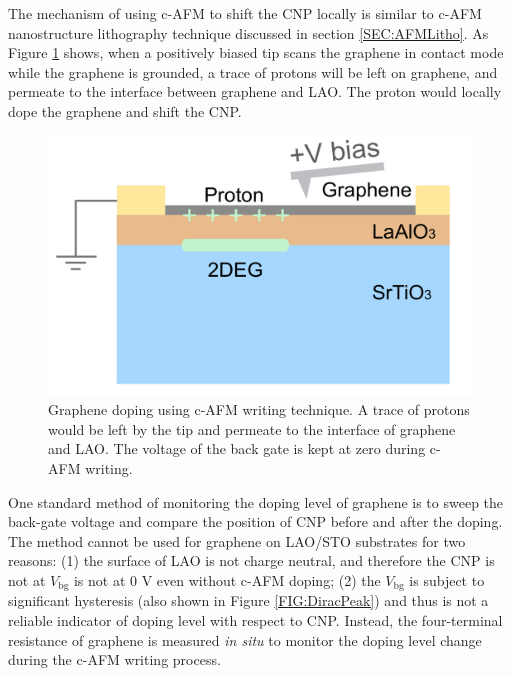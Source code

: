 \documentclass[pdflatex, sectionletters, 12pt]{pittetd}    %
\begin{document}
The mechanism of using c-AFM to shift the CNP locally is similar to c-AFM nanostructure lithography technique discussed in section \ref{SEC:AFMLitho}. As Figure \ref{FIG:GrapheneAFM} shows, when a positively biased tip scans the graphene in contact mode while the graphene is grounded, a trace of protons will be left on graphene, and permeate\cite{hu2014proton} to the interface between graphene and LAO. The proton would locally dope the graphene and shift the CNP. 
\\

\begin{figure}[h!]
	\centering
	\includegraphics[width=.45\textwidth]{Drawing/GrapheneAFM.pdf}
	\caption{Graphene doping using c-AFM writing technique. A trace of protons would be left by the tip and permeate to the interface of graphene and LAO. The voltage of the back gate is kept at zero during c-AFM writing.}
	\label{FIG:GrapheneAFM}
\end{figure}

One standard method of monitoring the doping level of graphene is to sweep the back-gate voltage and compare the position of CNP before and after the doping. The method cannot be used for graphene on LAO/STO substrates for two reasons: (1) the surface of LAO is not charge neutral, and therefore the CNP is not at $V_\mathrm{bg}$ is not at 0 V even without c-AFM doping; (2) the $V_\mathrm{bg}$ is subject to significant hysteresis\cite{couto2011transport, jnawali2017room} (also shown in Figure \ref{FIG:DiracPeak}) and thus is not a reliable indicator of doping level with respect to CNP. Instead, the four-terminal resistance of graphene is measured \emph{in situ} to monitor the doping level change during the c-AFM writing process. 
\end{document}
